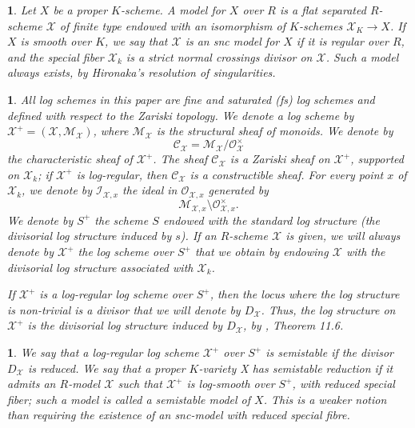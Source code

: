 \documentclass{amsart}%
\numberwithin{equation}{subsection}
\theoremstyle{plain2}
\theoremstyle{definition2}
\theoremstyle{stepstyle}
\theoremstyle{point}
\theoremstyle{subpoint}
\newtheorem{subpoint}[equation]{}%
\newcommand{\spa}[1]{\begin{subpoint}#1\end{subpoint}}           %
\newcommand{\cX}{\ensuremath{\mathscr{X}}}
\newcommand{\caM}{\ensuremath{\mathcal{M}}}
\newcommand{\caC}{\ensuremath{\mathcal{C}}}
\begin{document}
\spa{Let $X$ be a proper $K$-scheme. A model for $X$ over $R$ is a flat separated $R$-scheme $\cX$ of finite type endowed with an isomorphism of $K$-schemes $\cX_K \rightarrow X$. If $X$ is smooth over $K$,
we say that $\cX$ is an snc model for $X$ if it is regular over $R$, and the
special fiber $\cX_k$ is a strict normal crossings divisor on $\cX$. Such a model always exists, by Hironaka's resolution of singularities.}

\spa{ \label{sss-log} All log schemes in this paper are  fine and saturated (\emph{fs}) log schemes and defined with respect to the Zariski topology. We denote a log scheme by $\cX^+=(\cX,\caM_{\cX})$, where $\caM_{\cX}$ is the structural sheaf of monoids. We denote by $$\mathcal{C}_{\cX}=\mathcal{M}_{\cX}/\mathcal{O}_{\cX}^{\times}$$
the characteristic sheaf of $\cX^+$. The sheaf $\mathcal{C}_{\cX}$
is a Zariski sheaf on $\cX^+$, supported on $\cX_k$; if $\cX^+$ is log-regular, then $\caC_{\cX}$ is a constructible sheaf.
For every point $x$ of $\cX_k$, we denote by $\mathcal{I}_{\cX,x}$
the ideal in $\mathcal{O}_{\cX,x}$ generated by
$$\mathcal{M}_{\cX,x}\setminus \mathcal{O}_{\cX,x}^{\times}.$$ We denote
by $S^+$ the scheme $S$ endowed with the standard log structure
(the divisorial log structure induced by $s$). If an $R$-scheme $\cX$ is given, we will always denote by $\cX^+$ the log scheme over $S^+$ that we obtain by endowing $\cX$ with the divisorial log structure associated with
$\cX_k$.

If $\cX^+$ is a log-regular log scheme over $S^+$, then the locus where the log structure is non-trivial is a divisor that we will denote by $D_{\cX}$. Thus, the log structure on $\cX^+$ is the divisorial log structure induced by $D_{\cX}$, by \cite{Kato1994a}, Theorem 11.6.

}

\spa{We say that a log-regular log scheme $\cX^+$ over $S^+$ is semistable if the divisor $D_\cX$ is reduced. We say that a proper $K$-variety X has semistable reduction if it admits an $R$-model $\cX$ such that $\cX^+$ is log-smooth over $S^+$, with reduced special fiber; such a model is called a semistable model of $X$. This is a weaker notion than requiring the existence of an snc-model with reduced special fibre.}
\end{document}
